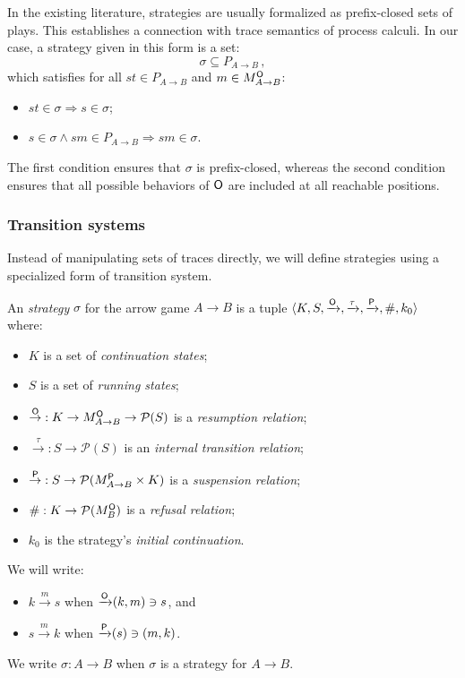 In the existing literature,
strategies are usually formalized as prefix-closed sets of plays.
This establishes a connection with trace semantics of process calculi.
In our case,
a strategy given in this form is a set:
\[ \sigma \subseteq P_{A \rightarrow B} \,, \]
which satisfies
for all $st \in P_{A \rightarrow B}$
and $m \in M_{A \rightarrow B}^{ \mathsf{O} }$:
\begin{itemize}
  \item $st \in \sigma \Rightarrow s \in \sigma$;
  \item $s \in \sigma \wedge sm \in P_{A \rightarrow B}
    \Rightarrow sm \in \sigma$.
\end{itemize}
The first condition ensures that $\sigma$ is prefix-closed,
whereas the second condition ensures that
all possible behaviors of $ \mathsf{O} $ are included
at all reachable positions.

\subsubsection{Transition systems}

Instead of manipulating sets of traces directly,
we will define strategies using a specialized form of transition system.

\begin{definition}
An \emph{strategy} $\sigma$ for the arrow game $A \rightarrow B$
is a tuple
$\langle K, S,
{\xrightarrow{ \mathsf{O} }},
{\xrightarrow{\tau}},
{\xrightarrow{ \mathsf{P} }},
 \#, k_0 \rangle$
where:
\begin{itemize}
  \item $K$ is a set of \emph{continuation states};
  \item $S$ is a set of \emph{running states};
  \item ${\stackrel{ \mathsf{O} }{\rightarrow}} :
         K \rightarrow M_{A \rightarrow B}^{ \mathsf{O} } \rightarrow \mathcal{P}(S)$
    is a \emph{resumption relation};
  \item ${\stackrel{\tau}{\rightarrow}} : S \rightarrow \mathcal{P}(S)$
    is an \emph{internal transition relation};
  \item ${\stackrel{ \mathsf{P} }{\rightarrow}} :
         S \rightarrow \mathcal{P}(M_{A \rightarrow B}^{ \mathsf{P} } \times K)$
    is a \emph{suspension relation};
  \item ${\#} : K \rightarrow \mathcal{P}(M_B^{ \mathsf{O} })$
    is a \emph{refusal relation};
  \item $k_0$
    is the strategy's \emph{initial continuation}.
\end{itemize}
We will write:
\begin{itemize}
  \item $k \xrightarrow{m} s$ when ${\xrightarrow{ \mathsf{O} }}(k, m) \ni s$, and
  \item $s \xrightarrow{m} k$ when ${\xrightarrow{ \mathsf{P} }}(s) \ni (m, k)$.
\end{itemize}
We write $\sigma : A \rightarrow B$ when $\sigma$ is a strategy
for $A \rightarrow B$.
\end{definition}

